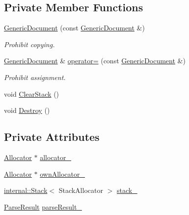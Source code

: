 \subsection*{Private Member Functions}
\begin{DoxyCompactItemize}
\item 
\mbox{\hyperlink{classrapidjson_1_1_generic_document_a64e1c6b526d02fd5ccb90bfc9fc80794}{Generic\+Document}} (const \mbox{\hyperlink{classrapidjson_1_1_generic_document}{Generic\+Document}} \&)
\begin{DoxyCompactList}\small\item\em Prohibit copying. \end{DoxyCompactList}\item 
\mbox{\hyperlink{classrapidjson_1_1_generic_document}{Generic\+Document}} \& \mbox{\hyperlink{classrapidjson_1_1_generic_document_ac57a2144909e74461503bca560b1269c}{operator=}} (const \mbox{\hyperlink{classrapidjson_1_1_generic_document}{Generic\+Document}} \&)
\begin{DoxyCompactList}\small\item\em Prohibit assignment. \end{DoxyCompactList}\item 
void \mbox{\hyperlink{classrapidjson_1_1_generic_document_aadd2423ddd54a26e915803fa5b7d8416}{Clear\+Stack}} ()
\item 
void \mbox{\hyperlink{classrapidjson_1_1_generic_document_a5ad487dd87d5af6a390d3b4fa2401876}{Destroy}} ()
\end{DoxyCompactItemize}
\subsection*{Private Attributes}
\begin{DoxyCompactItemize}
\item 
\mbox{\hyperlink{classrapidjson_1_1_allocator}{Allocator}} $\ast$ \mbox{\hyperlink{classrapidjson_1_1_generic_document_a3ea1933117950ae8d39ead0774c14f12}{allocator\+\_\+}}
\item 
\mbox{\hyperlink{classrapidjson_1_1_allocator}{Allocator}} $\ast$ \mbox{\hyperlink{classrapidjson_1_1_generic_document_af49b3668cb0b5a0561e5f26194ef2e31}{own\+Allocator\+\_\+}}
\item 
\mbox{\hyperlink{classrapidjson_1_1internal_1_1_stack}{internal\+::\+Stack}}$<$ Stack\+Allocator $>$ \mbox{\hyperlink{classrapidjson_1_1_generic_document_a21961da965bca1d65007e0b55ca639a8}{stack\+\_\+}}
\item 
\mbox{\hyperlink{structrapidjson_1_1_parse_result}{Parse\+Result}} \mbox{\hyperlink{classrapidjson_1_1_generic_document_a43e4cc449e68b2fb6ea6732b6a83d69e}{parse\+Result\+\_\+}}
\end{DoxyCompactItemize}
